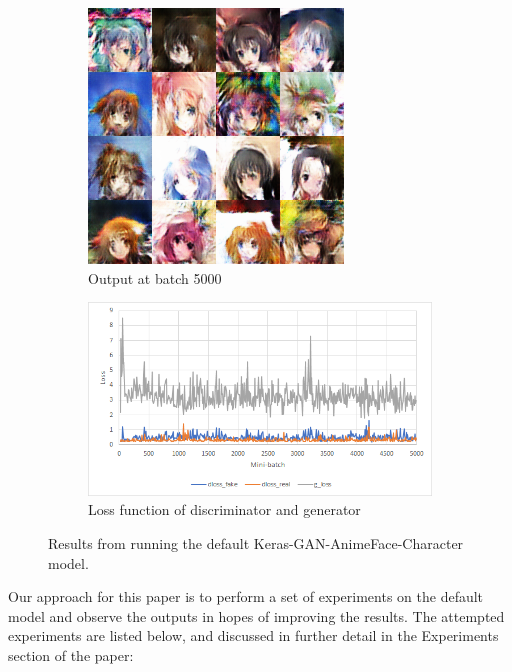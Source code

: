\documentclass{article} %
\begin{document}
\begin{figure}[h!]
\begin{subfigure}[b]{0.24\linewidth}
		\includegraphics[width=\linewidth]{keras_gen.png}
		\caption{Output at batch 5000}
		\label{fig:kerasGen}
	\end{subfigure}
	\begin{subfigure}[b]{0.5\linewidth}
		\includegraphics[width=\linewidth]{keras_loss.png}
		\caption{Loss function of discriminator and generator}
		\label{fig:kerasLoss}
	\end{subfigure}
	\caption{Results from running the default Keras-GAN-AnimeFace-Character model.}
	\label{fig:kerasDefault}
\end{figure}

	Our approach for this paper is to perform a set of experiments on the default model and observe the outputs in hopes of improving the results. The attempted experiments are listed below, and discussed in further detail in the Experiments section of the paper: 
\end{document}
